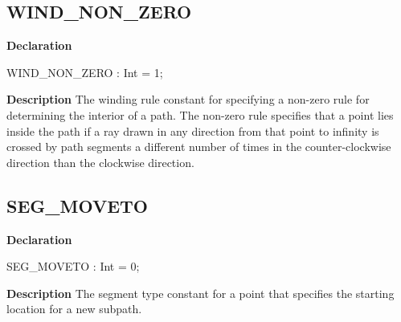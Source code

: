 \documentclass{report}
\newif\ifpdf
\begin{document}
\subsection*{WIND{\_}NON{\_}ZERO}
\fi
\label{NewPascal.GUI.Geom-WIND_NON_ZERO}
\begin{list}{}{
\setlength{\itemindent}{0cm}
\setlength{\listparindent}{0cm}
\setlength{\leftmargin}{\evensidemargin}
\addtolength{\leftmargin}{\tmplength}
\settowidth{\labelsep}{X}
\addtolength{\leftmargin}{\labelsep}
\setlength{\labelwidth}{\tmplength}
}
\item[\textbf{Declaration}\hfill]
\ifpdf
\begin{flushleft}
\fi
\begin{ttfamily}
WIND{\_}NON{\_}ZERO  : Int = 1;\end{ttfamily}

\ifpdf
\end{flushleft}
\fi

\par
\item[\textbf{Description}]
The winding rule constant for specifying a non{-}zero rule for determining the interior of a path. The non{-}zero rule specifies that a point lies inside the path if a ray drawn in any direction from that point to infinity is crossed by path segments a different number of times in the counter{-}clockwise direction than the clockwise direction.

\end{list}
\ifpdf
\subsection*{\large{\textbf{SEG{\_}MOVETO}}\normalsize\hspace{1ex}\hrulefill}
\else
\subsection*{SEG{\_}MOVETO}
\fi
\label{NewPascal.GUI.Geom-SEG_MOVETO}
\begin{list}{}{
\setlength{\itemindent}{0cm}
\setlength{\listparindent}{0cm}
\setlength{\leftmargin}{\evensidemargin}
\addtolength{\leftmargin}{\tmplength}
\settowidth{\labelsep}{X}
\addtolength{\leftmargin}{\labelsep}
\setlength{\labelwidth}{\tmplength}
}
\item[\textbf{Declaration}\hfill]
\ifpdf
\begin{flushleft}
\fi
\begin{ttfamily}
SEG{\_}MOVETO     : Int = 0;\end{ttfamily}

\ifpdf
\end{flushleft}
\fi

\par
\item[\textbf{Description}]
The segment type constant for a point that specifies the starting location for a new subpath.

\end{list}
\ifpdf
\end{document}
